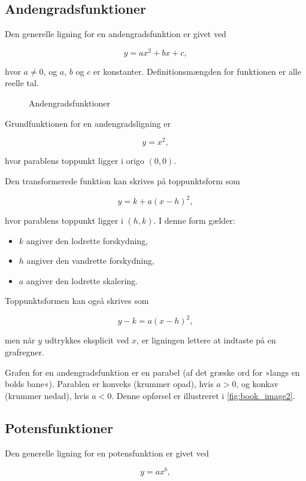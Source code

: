 \subsection*{Andengradsfunktioner}
Den generelle ligning for en andengradsfunktion er givet ved

\[
y = ax^2 + bx + c,
\]

hvor \(a \neq 0\), og \(a\), \(b\) og \(c\) er konstanter. Definitionsmængden for funktionen er alle reelle tal.

\begin{figure}[htbp]
    \centering
    \resizebox{\textwidth}{!}{\DaQuadraticPanels}
    \caption{Andengradsfunktioner}
    \label{fig:book_image2}
\end{figure}

Grundfunktionen for en andengradsligning er

\[
y = x^2,
\]

hvor parablens toppunkt ligger i origo \((0, 0)\).

Den transformerede funktion kan skrives på toppunktsform som

\[
y = k + a(x-h)^2,
\]

hvor parablens toppunkt ligger i \((h, k)\). I denne form gælder:
\begin{itemize}
    \item \(k\) angiver den lodrette forskydning,
    \item \(h\) angiver den vandrette forskydning,
    \item \(a\) angiver den lodrette skalering.
\end{itemize}

Toppunktsformen kan også skrives som

\[
y - k = a(x-h)^2,
\]

men når \(y\) udtrykkes eksplicit ved \(x\), er ligningen lettere at indtaste på en grafregner.

Grafen for en andengradsfunktion er en parabel (af det græske ord for »langs en bolds bane«). Parablen er konveks (krummer opad), hvis \(a > 0\), og konkav (krummer nedad), hvis \(a < 0\). Denne opførsel er illustreret i \autoref{fig:book_image2}.

\subsection*{Potensfunktioner}
Den generelle ligning for en potensfunktion er givet ved

\[
y = ax^b,
\]

